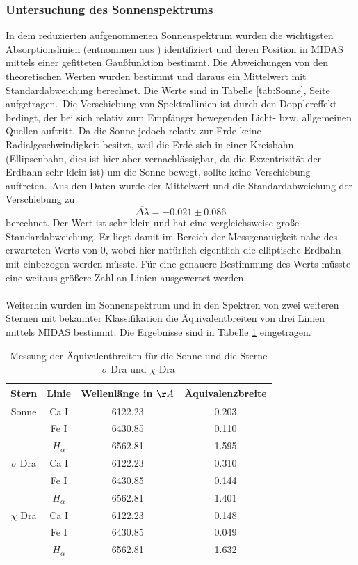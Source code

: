 \subsubsection{Untersuchung des Sonnenspektrums}
In dem reduzierten aufgenommenen Sonnenspektrum wurden die wichtigsten Absorptionslinien (entnommen aus \cite{ronomischesPraktikum}) identifiziert und deren Position in MIDAS mittels einer gefitteten Gaußfunktion bestimmt. Die Abweichungen von den theoretischen Werten wurden bestimmt und daraus ein Mittelwert mit Standardabweichung berechnet. Die Werte sind in Tabelle \ref{tab:Sonne}, Seite \pageref{tab:Sonne} aufgetragen.\
Die Verschiebung von Spektrallinien ist durch den Dopplereffekt bedingt, der bei sich relativ zum Empfänger bewegenden Licht- bzw. allgemeinen Quellen auftritt. Da die Sonne jedoch relativ zur Erde keine Radialgeschwindigkeit besitzt, weil die Erde sich in einer Kreisbahn (Ellipsenbahn, dies ist hier aber vernachlässigbar,  da die Exzentrizität der Erdbahn sehr klein ist) um die Sonne bewegt, sollte keine Verschiebung auftreten.\
Aus den Daten wurde der Mittelwert und die Standardabweichung der Verschiebung zu
\begin{equation}
\overline{\Delta\lambda} = -0.021 \pm 0.086
\end{equation}
berechnet. Der Wert ist sehr klein und hat eine vergleichsweise große Standardabweichung. Er liegt damit im Bereich der Messgenauigkeit nahe des erwarteten Werts von 0, wobei hier natürlich eigentlich die elliptische Erdbahn mit einbezogen werden müsste. Für eine genauere Bestimmung des Werts müsste eine weitaus größere Zahl an Linien ausgewertet werden.
\\
\\
Weiterhin wurden im Sonnenspektrum und in den Spektren von zwei weiteren Sternen mit bekannter Klassifikation die Äquivalentbreiten von drei Linien mittels MIDAS bestimmt. Die Ergebnisse sind in Tabelle \ref{tab:Aequivalentbreite} eingetragen.

\begin{table}
\begin{center}
\begin{tabular}{c|c|c|c}
Stern & Linie & Wellenlänge in $\AA$ & Äquivalenzbreite \\ 
\hline 
Sonne & Ca I & 6122.23 & 0.203 \\ 
& Fe I & 6430.85 & 0.110 \\ 
& $H_\alpha$ & 6562.81 & 1.595 \\ 
\hline
$\sigma$ Dra & Ca I & 6122.23 & 0.310 \\ 
& Fe I & 6430.85 & 0.144 \\  
& $H_\alpha$ & 6562.81 & 1.401 \\ 
\hline
$\chi$ Dra & Ca I & 6122.23 & 0.148 \\ 
& Fe  I & 6430.85 & 0.049 \\ 
& $H_\alpha$ & 6562.81 & 1.632 \\ 
\end{tabular}
\caption{Messung der Äquivalentbreiten für die Sonne und die Sterne $\sigma$ Dra und $\chi$ Dra}
\label{tab:Aequivalentbreite}
\end{center}
\end{table} 

